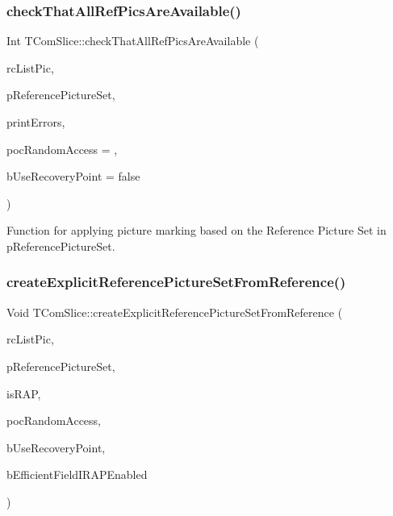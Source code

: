 \subsubsection{\texorpdfstring{check\+That\+All\+Ref\+Pics\+Are\+Available()}{checkThatAllRefPicsAreAvailable()}}
{\footnotesize\ttfamily Int T\+Com\+Slice\+::check\+That\+All\+Ref\+Pics\+Are\+Available (\begin{DoxyParamCaption}\item[{\hyperlink{class_t_com_list}{T\+Com\+List}$<$ \hyperlink{class_t_com_pic}{T\+Com\+Pic} $\ast$$>$ \&}]{rc\+List\+Pic,  }\item[{const \hyperlink{class_t_com_reference_picture_set}{T\+Com\+Reference\+Picture\+Set} $\ast$}]{p\+Reference\+Picture\+Set,  }\item[{Bool}]{print\+Errors,  }\item[{Int}]{poc\+Random\+Access = {},  }\item[{Bool}]{b\+Use\+Recovery\+Point = {\ttfamily false} }\end{DoxyParamCaption})}

Function for applying picture marking based on the Reference Picture Set in p\+Reference\+Picture\+Set. \mbox{\label{class_t_com_slice_a9dd70038c6ecdc52638d2f4261b3f2b3}} 
\subsubsection{\texorpdfstring{create\+Explicit\+Reference\+Picture\+Set\+From\+Reference()}{createExplicitReferencePictureSetFromReference()}}
{\footnotesize\ttfamily Void T\+Com\+Slice\+::create\+Explicit\+Reference\+Picture\+Set\+From\+Reference (\begin{DoxyParamCaption}\item[{\hyperlink{class_t_com_list}{T\+Com\+List}$<$ \hyperlink{class_t_com_pic}{T\+Com\+Pic} $\ast$$>$ \&}]{rc\+List\+Pic,  }\item[{const \hyperlink{class_t_com_reference_picture_set}{T\+Com\+Reference\+Picture\+Set} $\ast$}]{p\+Reference\+Picture\+Set,  }\item[{Bool}]{is\+R\+AP,  }\item[{Int}]{poc\+Random\+Access,  }\item[{Bool}]{b\+Use\+Recovery\+Point,  }\item[{const Bool}]{b\+Efficient\+Field\+I\+R\+A\+P\+Enabled }\end{DoxyParamCaption})}

